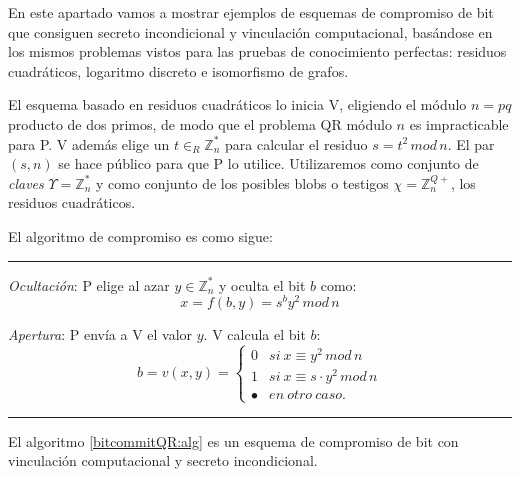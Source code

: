 En este apartado vamos a mostrar ejemplos de esquemas de compromiso de bit que consiguen secreto incondicional y vinculación computacional, basándose en los mismos problemas vistos para las pruebas de conocimiento perfectas: residuos cuadráticos, logaritmo discreto e isomorfismo de grafos.

\hfil

El esquema basado en residuos cuadráticos lo inicia V, eligiendo el módulo $n=pq$ producto de dos primos, de modo que el problema QR módulo $n$ es impracticable para P. V además elige un $t\in_R \mathbb{Z}_n^*$ para calcular el residuo $s=t^2\,mod\,n$. El par $(s,n)$ se hace público para que P lo utilice. Utilizaremos como conjunto de \textit{claves} $\Upsilon = \mathbb{Z}_n^*$ y como conjunto de los posibles blobs o testigos $\chi = \mathbb{Z}_n^{Q+}$, los residuos cuadráticos.

El algoritmo de compromiso es como sigue:



\hfil

\rule{\textwidth}{1pt}
\begin{algorithm}\label{commitQRsec:alg}
	\hfil
	
	\textit{Ocultación}: P elige al azar $y\in \mathbb{Z}_n^*$ y oculta el bit $b$ como:
	\[x = f(b,y) = s^b y^2 \, mod \, n \]
	
	\textit{Apertura}: P envía a V el valor $y$. V calcula el bit $b$:
	\[ b = v(x,y) = 
	\begin{cases}
	0  & si\ x\equiv y^2 \, mod \, n  \\
	1 & si\ x\equiv s\cdot y^2 \, mod \, n\\
	\bullet & en\ otro\ caso.
	\end{cases}
	\]
	\label{bitcommitQR:alg}
\end{algorithm}
\rule{\textwidth}{1pt}

\hfil


\begin{proposition}
	El algoritmo \ref{bitcommitQR:alg} es un esquema de compromiso de bit con vinculación computacional y secreto incondicional.
\end{proposition}


